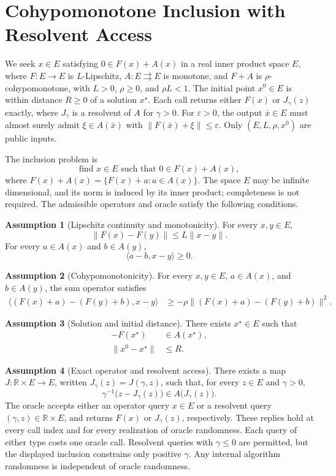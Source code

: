 \documentclass[10pt]{article}
\theoremstyle{definition}
\newtheorem{assumption}{Assumption}
\begin{document}
\section*{Cohypomonotone Inclusion with Resolvent Access}
We seek $x\in E$ satisfying $0\in F(x)+A(x)$ in a real inner product space $E$, where $F:E\to E$ is $L$-Lipschitz, $A:E\rightrightarrows E$ is monotone, and $F+A$ is $\rho$-cohypomonotone, with $L>0$, $\rho\geq0$, and $\rho L<1$. The initial point $x^0\in E$ is within distance $R\geq0$ of a solution $x^\star$. Each call returns either $F(x)$ or $J_\gamma(z)$ exactly, where $J_\gamma$ is a resolvent of $A$ for $\gamma>0$. For $\varepsilon>0$, the output $\bar{x}\in E$ must almost surely admit $\xi\in A(\bar{x})$ with $\|F(\bar{x})+\xi\|\leq\varepsilon$. Only $(E,L,\rho,x^0)$ are public inputs.

The inclusion problem is
\[
\text{find }x\in E\text{ such that }0\in F(x)+A(x),
\]
where $F(x)+A(x)=\{F(x)+a:a\in A(x)\}$. The space $E$ may be infinite dimensional, and its norm is induced by its inner product; completeness is not required. The admissible operators and oracle satisfy the following conditions.

\begin{assumption}[Lipschitz continuity and monotonicity]
For every $x,y\in E$,
\[
\|F(x)-F(y)\|\leq L\|x-y\|.
\]
For every $a\in A(x)$ and $b\in A(y)$,
\[
\langle a-b,x-y\rangle\geq0.
\]
\end{assumption}

\begin{assumption}[Cohypomonotonicity]
For every $x,y\in E$, $a\in A(x)$, and $b\in A(y)$, the sum operator satisfies
\[
\begin{aligned}
\langle (F(x)+a)-(F(y)+b),x-y\rangle
&\geq -\rho\|(F(x)+a)-(F(y)+b)\|^2.
\end{aligned}
\]
\end{assumption}

\begin{assumption}[Solution and initial distance]
There exists $x^\star\in E$ such that
\[
\begin{aligned}
-F(x^\star)&\in A(x^\star),\\
\|x^0-x^\star\|&\leq R.
\end{aligned}
\]
\end{assumption}

\begin{assumption}[Exact operator and resolvent access]
There exists a map $J:\mathbb{R}\times E\to E$, written $J_\gamma(z)=J(\gamma,z)$, such that, for every $z\in E$ and $\gamma>0$,
\[
\gamma^{-1}\bigl(z-J_\gamma(z)\bigr)\in A\bigl(J_\gamma(z)\bigr).
\]
The oracle accepts either an operator query $x\in E$ or a resolvent query $(\gamma,z)\in\mathbb{R}\times E$, and returns $F(x)$ or $J_\gamma(z)$, respectively. These replies hold at every call index and for every realization of oracle randomness. Each query of either type costs one oracle call. Resolvent queries with $\gamma\leq0$ are permitted, but the displayed inclusion constrains only positive $\gamma$. Any internal algorithm randomness is independent of oracle randomness.
\end{assumption}
\end{document}
